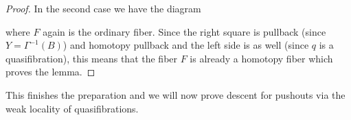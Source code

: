 \begin{lemma}
\begin{proof}
        In the second case we have the diagram
        \begin{center}
        \end{center}
        where $F$ again is the ordinary fiber.
        Since the right square is pullback (since $Y=\Gamma^{-1}(B)$) and homotopy pullback and the left side is as well (since $q$ is a quasifibration), this means that the fiber $F$ is already a homotopy fiber which proves the lemma.
    \end{proof}
\end{lemma}
This finishes the preparation and we will now prove descent for pushouts via the weak locality of quasifibrations.
